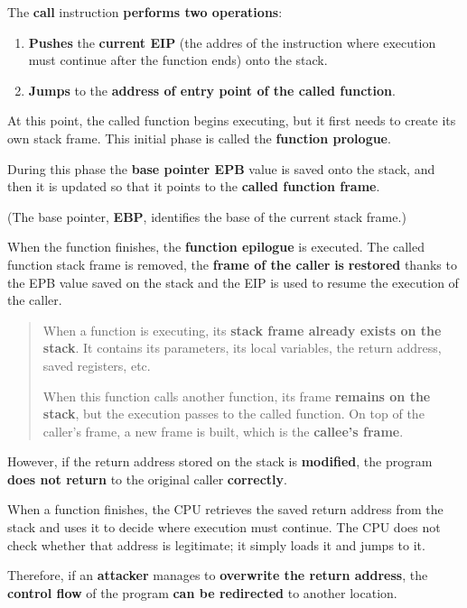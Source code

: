 \documentclass{article}
\begin{document}
The \textbf{call} instruction \textbf{performs two operations}:

\begin{enumerate}
\item \textbf{Pushes} the \textbf{current EIP} (the addres of the instruction where execution must continue after the function ends) onto the stack.
\item \textbf{Jumps} to the \textbf{address of entry point of the called function}.
\end{enumerate}

At this point, the called function begins executing, but it first needs to create its own stack frame. This initial phase is called the \textbf{function prologue}.

During this phase the \textbf{base pointer EPB} value is saved onto the stack, and then it is updated so that it points to the \textbf{called function frame}.

(The base pointer, \textbf{EBP}, identifies the base of the current stack frame.)

When the function finishes, the \textbf{function epilogue} is executed. The called function stack frame is removed, the \textbf{frame of the caller} \textbf{is} \textbf{restored} thanks to the EPB value saved on the stack and the EIP is used to resume the execution of the caller.

\begin{quote}
When a function is executing, its \textbf{stack frame already exists on the stack}. It contains its parameters, its local variables, the return address, saved registers, etc.

When this function calls another function, its frame \textbf{remains on the stack}, but the execution passes to the called function. On top of the caller's frame, a new frame is built, which is the \textbf{callee's frame}.
\end{quote}

However, if the return address stored on the stack is \textbf{modified}, the program \textbf{does not return} to the original caller \textbf{correctly}.

When a function finishes, the CPU retrieves the saved return address from the stack and uses it to decide where execution must continue. The CPU does not check whether that address is legitimate; it simply loads it and jumps to it.

Therefore, if an \textbf{attacker} manages to \textbf{overwrite the return address}, the \textbf{control flow} of the program \textbf{can be redirected} to another location.
\end{document}
